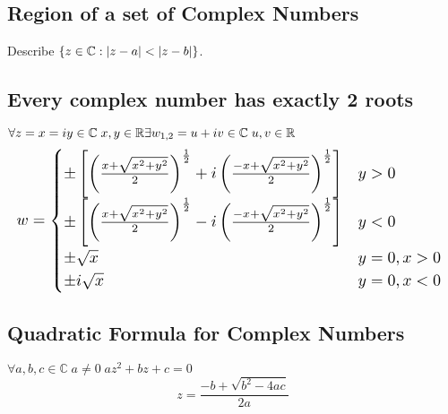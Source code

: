 \subsection*{Region of a set of Complex Numbers}
Describe $\{z \in \mathbb{C} : \left|z - a\right| < \left|z - b\right|\}$.
\subsection*{Every complex number has exactly 2 roots}
$\forall z = x = iy \in \mathbb{C} \; x, y \in \mathbb{R} \\
\exists w_{1, 2} = u + iv \in \mathbb{C} \; u, v \in \mathbb{R}$
\begin{equation*}
	\resizebox{\columnwidth}{!}{%
		$w = \begin{cases}
			\pm \left[ \left(\frac{x + \sqrt{x^2 + y^2}}{2} \right)^{\frac{1}{2}} + i \left( \frac{-x + \sqrt{x^2 + y^2}}{2} \right)^{\frac{1}{2}} \right] & y > 0 \\
			\pm \left[ \left(\frac{x + \sqrt{x^2 + y^2}}{2} \right)^{\frac{1}{2}} - i \left(\frac{-x + \sqrt{x^2 + y^2}}{2} \right)^{\frac{1}{2}} \right] & y < 0 \\
			\pm \sqrt{x} & y = 0, x > 0 \\
			\pm i \sqrt{x} & y = 0, x < 0
		\end{cases}$
	}
\end{equation*}
\subsection*{Quadratic Formula for Complex Numbers}
$\forall a, b, c \in \mathbb{C} \; a \neq 0 \; az^2 + bz + c = 0$
\begin{equation*}
	z = \frac{-b + \sqrt{b^2 - 4ac}}{2a}
\end{equation*}